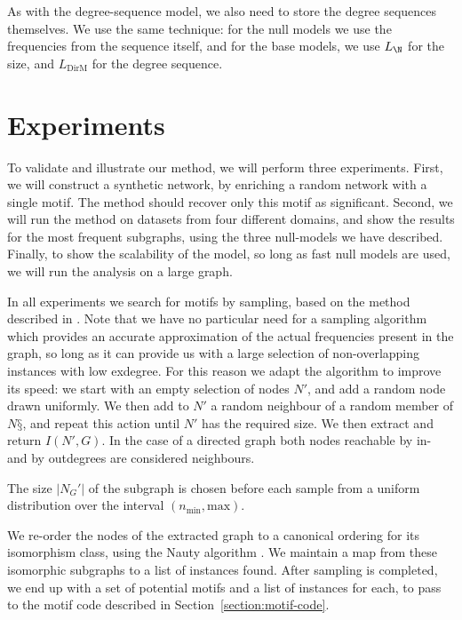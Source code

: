 As with the degree-sequence model, we also need to store the degree sequences themselves. We use the same technique: for the null models we use the frequencies from the sequence itself, and for the base models, we use $L_\N$ for the size, and $L_\text{DirM}$ for the degree sequence. 

\section{Experiments}

To validate and illustrate our method, we will perform three experiments. First, we will construct a synthetic network, by enriching a random network with a single motif. The method should recover only this motif as significant. Second, we will run the method on datasets from four different domains, and show the results for the most frequent subgraphs, using the three null-models we have described. Finally, to show the scalability of the model, so long as fast null models are used, we will run the analysis on a large graph.

In all experiments we search for motifs by sampling, based on the method described in \cite{kashtan2004efficient}. Note that we have no particular need for a sampling algorithm which provides an accurate approximation of the actual frequencies present in the graph, so long as it can provide us with a large selection of non-overlapping instances with low exdegree. For this reason we adapt the algorithm to improve its speed: we start with an empty selection of nodes $N'$, and add a random node drawn uniformly. We then add to $N'$ a random neighbour of a random member of $N§$, and repeat this action until $N'$ has the required size. We then extract and return $I(N', G)$. In the case of a directed graph both nodes reachable by in- and by outdegrees are considered neighbours.  

The size $|N_G'|$ of the subgraph is chosen before each sample from a uniform distribution over the interval $(n_\text{min}, \text{max})$.

We re-order the nodes of the extracted graph to a canonical ordering for its isomorphism class, using the Nauty algorithm \cite{mckay1981practical}. We maintain a map from these isomorphic subgraphs to a list of instances found. After sampling is completed, we end up with a set of potential motifs and a list of instances for each, to pass to the motif code described in Section~\ref{section:motif-code}.

